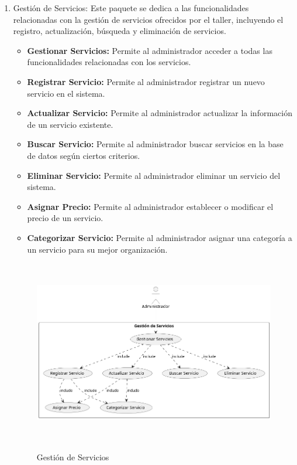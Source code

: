 \begin{enumerate}
	\item Gestión de Servicios: Este paquete se dedica a las funcionalidades relacionadas con la gestión de servicios ofrecidos por el taller, incluyendo el registro, actualización, búsqueda y eliminación de servicios.
	\begin{itemize}
		\item \textbf{Gestionar Servicios:} Permite al administrador acceder a todas las funcionalidades relacionadas con los servicios.
		\item \textbf{Registrar Servicio:} Permite al administrador registrar un nuevo servicio en el sistema.
		\item \textbf{Actualizar Servicio:} Permite al administrador actualizar la información de un servicio existente.
		\item \textbf{Buscar Servicio:} Permite al administrador buscar servicios en la base de datos según ciertos criterios.
		\item \textbf{Eliminar Servicio:} Permite al administrador eliminar un servicio del sistema.
		\item \textbf{Asignar Precio:} Permite al administrador establecer o modificar el precio de un servicio.
		\item \textbf{Categorizar Servicio:} Permite al administrador asignar una categoría a un servicio para su mejor organización.
	\end{itemize}
	\begin{figure}[H]
		\centering
		\caption{Gestión de Servicios}
		\includegraphics[width=12cm, height=8cm]{imagenes/cap4/casosUso/GestionServicios.png}
		\label{fig:Caso3}
	\end{figure}
	

\end{enumerate}
